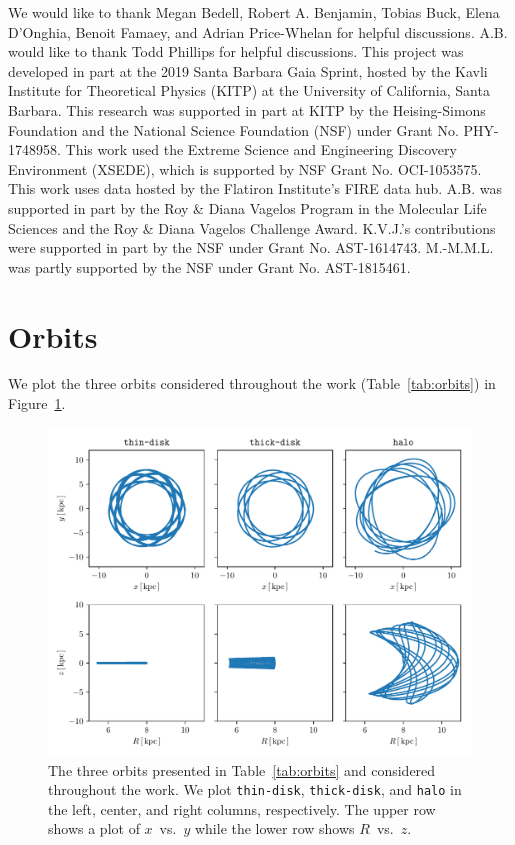 \documentclass[twocolumn]{aastex62}
\newcommand{\thin}{\texttt{thin-disk}}
\newcommand{\thick}{\texttt{thick-disk}}
\newcommand{\halo}{\texttt{halo}}
\begin{document}
\acknowledgments
We would like to thank Megan Bedell, Robert A. Benjamin, Tobias Buck, Elena
D'Onghia, Benoit Famaey, and Adrian Price-Whelan for helpful discussions. A.B.
would like to thank Todd Phillips for helpful discussions. This project was
developed in part at the 2019 Santa Barbara Gaia Sprint, hosted by the Kavli
Institute for Theoretical Physics (KITP) at the University of California,
Santa Barbara. This research was supported in part at KITP by the
Heising-Simons Foundation and the National Science Foundation (NSF) under
Grant No. PHY-1748958. This work used the Extreme Science and Engineering
Discovery Environment (XSEDE), which is supported by NSF Grant No.
OCI-1053575. This work uses data hosted by the Flatiron Institute's FIRE data hub. A.B. was supported in part by the Roy \& Diana Vagelos Program in
the Molecular Life Sciences and the Roy \& Diana Vagelos Challenge Award.
K.V.J.'s contributions were supported in part by the NSF under Grant No.
AST-1614743. M.-M.M.L. was partly supported by the NSF under Grant No.
AST-1815461.


\appendix
\section{Orbits} \label{app:orbits}
We plot the three orbits considered throughout the work
(Table~\ref{tab:orbits}) in Figure~\ref{fig:plot_orbits}.

\begin{figure}[htb!]
\begin{center}
\includegraphics[width=\textwidth]{fig/orbits.pdf}
\end{center}
\caption{The three orbits presented in Table~\ref{tab:orbits} and considered
throughout the work. We plot \thin{}, \thick{}, and \halo{} in the
left, center, and right columns, respectively. The upper row shows a plot of
$x$~vs.~$y$ while the lower row shows $R$~vs.~$z$.}
\label{fig:plot_orbits}
\end{figure}
\end{document}
